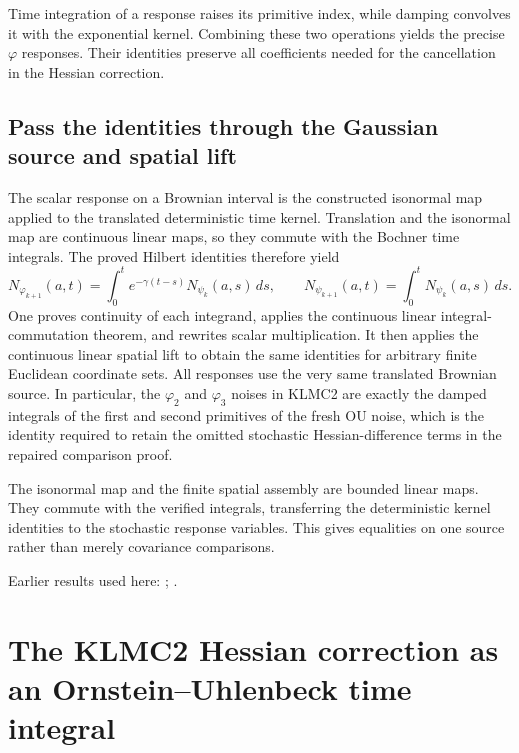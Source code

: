 \documentclass[11pt,a4paper]{report}
\begin{document}
Time integration of a response raises its primitive index, while damping convolves it with the exponential kernel. Combining these two operations yields the precise \(\varphi\) responses. Their identities preserve all coefficients needed for the cancellation in the Hessian correction.

\subsection{\texorpdfstring{Pass the identities through the Gaussian source and spatial lift}{Pass the identities through the Gaussian source and spatial lift}}
\label{report-step-KineticLangevin-KernelConvolution-lean-5}


The scalar response on a Brownian interval is the constructed isonormal map applied to the translated deterministic time kernel. Translation and the isonormal map are continuous linear maps, so they commute with the Bochner time integrals. The proved Hilbert identities therefore yield \[N_{\varphi_{k+1}}(a,t)=\int_0^t e^{-\gamma(t-s)}N_{\psi_k}(a,s)\,ds,\qquad N_{\psi_{k+1}}(a,t)=\int_0^tN_{\psi_k}(a,s)\,ds.\] One proves continuity of each integrand, applies the continuous linear integral-commutation theorem, and rewrites scalar multiplication. It then applies the continuous linear spatial lift to obtain the same identities for arbitrary finite Euclidean coordinate sets. All responses use the very same translated Brownian source. In particular, the \(\varphi _{2}\) and \(\varphi _{3}\) noises in KLMC2 are exactly the damped integrals of the first and second primitives of the fresh OU noise, which is the identity required to retain the omitted stochastic Hessian-difference terms in the repaired comparison proof.



The isonormal map and the finite spatial assembly are bounded linear maps. They commute with the verified integrals, transferring the deterministic kernel identities to the stochastic response variables. This gives equalities on one source rather than merely covariance comparisons.



Earlier results used here: \cite[Section~3.6.12]{LangevinLean2026ULASC}; \cite[Section~3.8.5]{LangevinLean2026ULASC}.
\section{\texorpdfstring{The KLMC2 Hessian correction as an Ornstein–Uhlenbeck time integral}{The KLMC2 Hessian correction as an Ornstein–Uhlenbeck time integral}}
\label{proof-module-KineticLangevin-FreeOUCorrection-lean}
\end{document}
